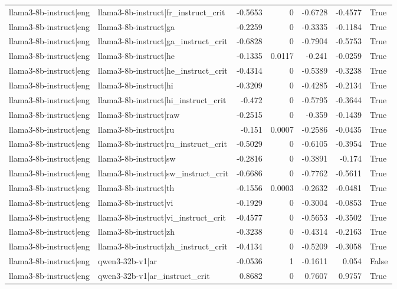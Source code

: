 \begin{table}
\begin{tabular}{l l r r r r l}
llama3-8b-instruct|eng & llama3-8b-instruct|fr_instruct_crit & -0.5653 & 0 & -0.6728 & -0.4577 & True \\
llama3-8b-instruct|eng & llama3-8b-instruct|ga & -0.2259 & 0 & -0.3335 & -0.1184 & True \\
llama3-8b-instruct|eng & llama3-8b-instruct|ga_instruct_crit & -0.6828 & 0 & -0.7904 & -0.5753 & True \\
llama3-8b-instruct|eng & llama3-8b-instruct|he & -0.1335 & 0.0117 & -0.241 & -0.0259 & True \\
llama3-8b-instruct|eng & llama3-8b-instruct|he_instruct_crit & -0.4314 & 0 & -0.5389 & -0.3238 & True \\
llama3-8b-instruct|eng & llama3-8b-instruct|hi & -0.3209 & 0 & -0.4285 & -0.2134 & True \\
llama3-8b-instruct|eng & llama3-8b-instruct|hi_instruct_crit & -0.472 & 0 & -0.5795 & -0.3644 & True \\
llama3-8b-instruct|eng & llama3-8b-instruct|raw & -0.2515 & 0 & -0.359 & -0.1439 & True \\
llama3-8b-instruct|eng & llama3-8b-instruct|ru & -0.151 & 0.0007 & -0.2586 & -0.0435 & True \\
llama3-8b-instruct|eng & llama3-8b-instruct|ru_instruct_crit & -0.5029 & 0 & -0.6105 & -0.3954 & True \\
llama3-8b-instruct|eng & llama3-8b-instruct|sw & -0.2816 & 0 & -0.3891 & -0.174 & True \\
llama3-8b-instruct|eng & llama3-8b-instruct|sw_instruct_crit & -0.6686 & 0 & -0.7762 & -0.5611 & True \\
llama3-8b-instruct|eng & llama3-8b-instruct|th & -0.1556 & 0.0003 & -0.2632 & -0.0481 & True \\
llama3-8b-instruct|eng & llama3-8b-instruct|vi & -0.1929 & 0 & -0.3004 & -0.0853 & True \\
llama3-8b-instruct|eng & llama3-8b-instruct|vi_instruct_crit & -0.4577 & 0 & -0.5653 & -0.3502 & True \\
llama3-8b-instruct|eng & llama3-8b-instruct|zh & -0.3238 & 0 & -0.4314 & -0.2163 & True \\
llama3-8b-instruct|eng & llama3-8b-instruct|zh_instruct_crit & -0.4134 & 0 & -0.5209 & -0.3058 & True \\
llama3-8b-instruct|eng & qwen3-32b-v1|ar & -0.0536 & 1 & -0.1611 & 0.054 & False \\
llama3-8b-instruct|eng & qwen3-32b-v1|ar_instruct_crit & 0.8682 & 0 & 0.7607 & 0.9757 & True \\

\end{tabular}
\end{table}
